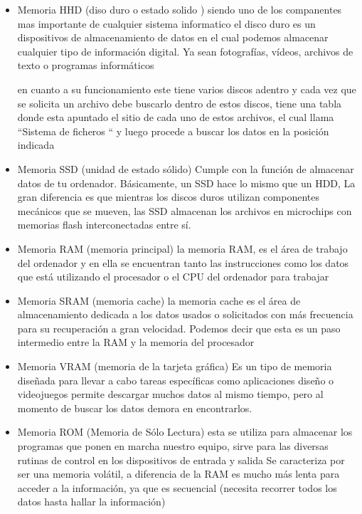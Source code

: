 \documentclass[12pt]{report}
\begin{document}
 \begin{itemize}
        \item { Memoria HHD (diso duro o estado solido )}
        siendo uno de los companentes mas importante de cualquier sistema informatico el disco duro es un dispositivos de almacenamiento de datos en el cual podemos almacenar cualquier tipo de información digital. Ya sean fotografías, vídeos, archivos de texto o programas informáticos
        
        en cuanto a su funcionamiento este tiene varios discos adentro y cada vez que se solicita un archivo debe buscarlo dentro de estos discos, tiene una tabla donde esta apuntado  el sitio de cada uno de estos archivos, el cual llama “Sistema de ficheros “  y luego procede a buscar los datos en la posición indicada
        
         \item { Memoria SSD (unidad de estado sólido)} Cumple con la función de almacenar datos de tu ordenador. Básicamente, un SSD hace lo mismo que un HDD, La gran diferencia es que mientras los discos duros utilizan componentes mecánicos que se mueven, las SSD almacenan los archivos en microchips con memorias flash interconectadas entre sí.
        
         \item { Memoria RAM (memoria principal) }la memoria RAM, es el área de trabajo del ordenador y en ella se encuentran tanto las instrucciones  como los datos que está utilizando el procesador o el CPU del ordenador para trabajar
        
         \item { Memoria SRAM (memoria cache)} la memoria cache es el área de almacenamiento dedicada a los datos usados o solicitados con más frecuencia para su recuperación a gran velocidad. Podemos decir que esta es un paso intermedio entre la RAM y la memoria del procesador
        
         \item { Memoria VRAM (memoria de la tarjeta gráfica)}
        Es un tipo de memoria diseñada para llevar a cabo tareas específicas como aplicaciones diseño o videojuegos permite descargar muchos datos al mismo tiempo, pero al momento de buscar los datos demora en encontrarlos. 
  
        \item { Memoria ROM (Memoria de Sólo Lectura)}  esta se utiliza para almacenar los programas que ponen en marcha nuestro equipo, sirve para las diversas rutinas de control en los dispositivos de entrada y salida 
        Se caracteriza por ser una memoria volátil, a diferencia de la RAM es mucho más lenta para acceder a la información, ya que es secuencial (necesita recorrer todos los datos hasta hallar la información) 
        

\end{itemize}
\end{document}
